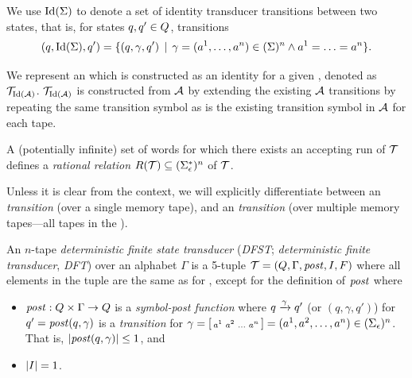We use $\text{Id}(\Sigma)$ to denote a set of identity transducer transitions between two states, that is, for states $q, q' \in Q$, transitions
$$(q, \text{Id}(\Sigma), q') = \{ (q, \gamma, q') \,\mid\, \gamma = (a^1, \ldots, a^n) \in (\Sigma)^n \land a^1 = \ldots = a^n \}\text{.}$$

We represent an \nft which is constructed as an identity \nft for a given \nfa, denoted as $\mathcal{T}_{\text{Id}(\mathcal{A})}$.
$\mathcal{T}_{\text{Id}(\mathcal{A})}$ is constructed from $\mathcal{A}$ by extending the existing $\mathcal{A}$ transitions by repeating the same transition symbol as is the existing transition symbol in $\mathcal{A}$ for each tape.

A (potentially infinite) set of words for which there exists an accepting run of $\mathcal{T}$ defines a \emph{rational relation} $R(\mathcal{T}) \subseteq (\Sigma_\epsilon^*)^n$ of \nft $\mathcal{T}$.

Unless it is clear from the context, we will explicitly differentiate between an \emph{\nfa transition} (over a single memory tape), and an \emph{\nft transition} (over multiple memory tapes---all tapes in the \nft).

\begin{definition} \hfill \newline
An $n$-tape \emph{deterministic finite state transducer} (\emph{DFST}; \emph{deterministic finite transducer}, \emph{DFT}) over an alphabet $\Gamma$ is a 5-tuple $\mathcal{T} = (Q, \Gamma, \mathit{post}, I, F)$ where all elements in the tuple are the same as for \nft, except for the definition of $\mathit{post}$ where
\begin{itemize}
    \item $\mathit{post}: Q \times \Gamma \rightarrow Q$ is a \emph{symbol-post function} where ${q} \xrightarrow{{\gamma}} {q'}$ (or $(q, \gamma, q')$) for\\$q' = \mathit{post}(q, \gamma)$ is a \emph{transition} for $\gamma = \begin{bsmallmatrix} a^1 & a^2 & \ldots & a^n\end{bsmallmatrix} = (a^1, a^2, \ldots, a^n) \in (\Sigma_\epsilon)^n$. That is, $|\mathit{post}(q, \gamma)| \leq 1$, and
    \item $|I| = 1$.
\end{itemize}
\end{definition}

